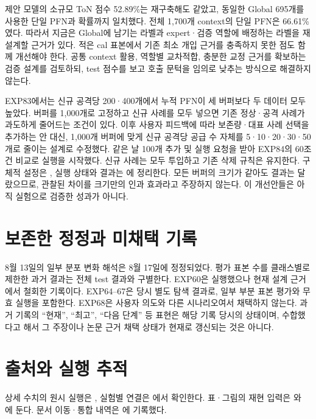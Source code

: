 제안 모델의 소규모 ToN 점수 52.89\%는 재구축해도 같았고, 동일한 Global 695개를 사용한 단일 PFN과 확률까지 일치했다.
전체 1,700개 context의 단일 PFN은 66.61\%였다.
따라서 지금은 Global에 남기는 라벨과 expert·검증 역할에 배정하는 라벨을 재설계할 근거가 있다.
적은 cal 표본에서 기존 최소 개입 근거를 충족하지 못한 점도 함께 개선해야 한다.
공통 context 활용, 역할별 교차적합, 충분한 교정 근거를 확보하는 검증 설계를 검토하되,
test 점수를 보고 호출 문턱을 임의로 낮추는 방식으로 해결하지 않는다.

EXP83에서는 신규 공격당 200·400개에서 누적 PFN이 세 버퍼보다 두 데이터 모두 높았다.
버퍼를 1,000개로 고정하고 신규 사례를 모두 넣으면 기존 정상·공격 사례가 과도하게 줄어드는 조건이 있다.
이후 사용자 피드백에 따라 보존량·대표 사례 선택을 추가하는 안 대신, 1,000개 버퍼에 맞게 신규 공격당 공급 수 자체를 5·10·20·30·50개로 줄이는 설계로 수정했다. 같은 날 100개 추가 및 실행 요청을 받아 EXP84의 60조건 비교로 실행을 시작했다. 신규 사례는 모두 투입하고 기존 삭제 규칙은 유지한다. 구체적 설정은 , 실행 상태와 결과는 에 정리한다.
모든 버퍼의 크기가 같아도 결과는 달랐으므로, 관찰된 차이를 크기만의 인과 효과라고 주장하지 않는다.
이 개선안들은 아직 실험으로 검증한 성과가 아니다.

\section{보존한 정정과 미채택 기록}
8월 13일의 일부 분포 변화 해석은 8월 17일에 정정되었다.
평가 표본 수를 클래스별로 제한한 과거 결과는 전체 test 결과와 구별한다.
EXP60은 실행했으나 현재 설계 근거에서 철회한 기록이다.
EXP64--67은 당시 별도 탐색 결과로, 일부 부분 표본 평가와 무효 실행을 포함한다.
EXP68은 사용자 의도와 다른 시나리오여서 채택하지 않는다.
과거 기록의 ``현재'', ``최고'', ``다음 단계'' 등 표현은 해당 기록 당시의 상태이며,
수합했다고 해서 그 주장이나 논문 근거 채택 상태가 현재로 갱신되는 것은 아니다.



\section*{출처와 실행 추적}

상세 수치의 원시 실행은 , 실험별 연결은 에서 확인한다. 표·그림의 재현 입력은 와 에 둔다. 문서 이동·통합 내역은 에 기록했다.



